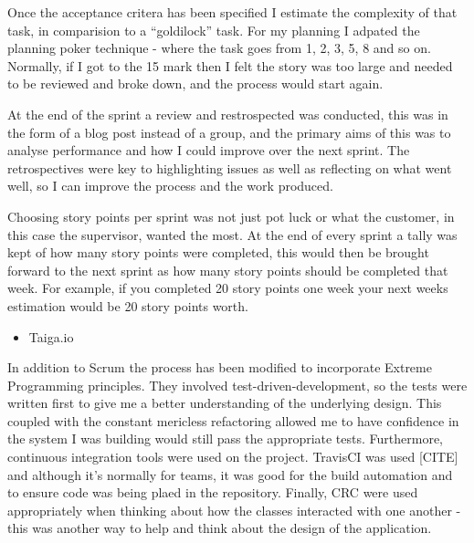 Once the acceptance critera has been specified I estimate the complexity of that task, in comparision to a ``goldilock'' task.  For my planning I adpated the planning poker technique - where the task goes from 1, 2, 3, 5, 8 and so on. Normally, if I got to the 15 mark then I felt the story was too large and needed to be reviewed and broke down, and the process would start again.

At the end of the sprint a review and restrospected was conducted, this was in the form of a blog post instead of a group, and the primary aims of this was to analyse performance and how I could improve over the next sprint. The retrospectives were key to highlighting issues as well as reflecting on what went well, so I can improve the process and the work produced.

Choosing story points per sprint was not just pot luck or what the customer, in this case the supervisor, wanted the most. At the end of every sprint a tally was kept of how many story points were completed, this would then be brought forward to the next sprint as how many story points should be completed that week. For example, if you completed 20 story points one week your next weeks estimation would be 20 story points worth.


\begin{itemize}
  \item Taiga.io
\end{itemize}
In addition to Scrum the process has been modified to incorporate Extreme Programming principles. They involved test-driven-development, so the tests were written first to give me a better understanding of the underlying design. This coupled with the constant mericless refactoring allowed me to have confidence in the system I was building would still pass the appropriate tests. Furthermore, continuous integration tools were used on the project. TravisCI was used [CITE] and although it's normally for teams, it was good for the build automation and to ensure code was being plaed in the repository. Finally, CRC were used appropriately when thinking about how the classes interacted with one another - this was another way to help and think about the design of the application. 

